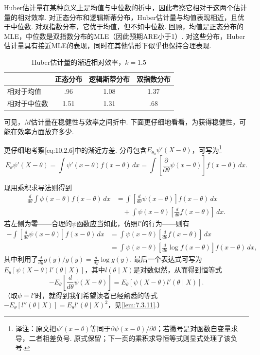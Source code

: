 \begin{example}[Huber估计量的ARE]\label{ex:10.2.7}
Huber估计量在某种意义上是均值与中位数的折中，因此考察它相对于这两个估计量的相对效率. 对正态分布和逻辑斯蒂分布，Huber估计量与均值表现相近，且优于中位数. 对双指数分布，它优于均值，但不如中位数. 回顾，均值是正态分布的MLE，中位数是双指数分布的MLE（因此预期ARE小于1）. 对这些分布，Huber估计量具有接近MLE的表现，同时在其他情形下似乎也保持合理表现.

\par\begin{table}[htbp]\centering
\caption{Huber估计量的渐近相对效率，$k=1.5$}\label{tab:10.2.4}
\begin{tabular}{l|ccc}\toprule
&正态分布&逻辑斯蒂分布&双指数分布\\\midrule
相对于均值&.96&1.08&1.37\\
相对于中位数&1.51&1.31&.68\\\bottomrule
\end{tabular}
\end{table}\par
\end{example}

可见，$M$估计量在稳健性与效率之间折中. 下面更仔细地看看，为获得稳健性，可能在效率方面放弃多少.

更仔细地考察\eqref{eq:10.2.6}中的渐近方差. 分母包含$E_{\theta_0}\psi'(X-\theta)$，可写为\footnote{译注：原文把$\psi'(x-\theta)$等同于$\partial\psi(x-\theta)/\partial\theta$；若撇号是对函数自变量求导，二者相差负号. 原式保留；下一页的乘积求导恒等式则显式处理了该负号.}
$$E_\theta\psi'(X-\theta)=\int\psi'(x-\theta)f(x-\theta)\,dx
=\int\left[\frac\partial{\partial\theta}\psi(x-\theta)\right]f(x-\theta)\,dx.$$

现用乘积求导法则得到
$$\begin{aligned}
\frac d{d\theta}\int\psi(x-\theta)f(x-\theta)\,dx
&=\int\left[\frac d{d\theta}\psi(x-\theta)\right]f(x-\theta)\,dx\\
&\quad+\int\psi(x-\theta)\left[\frac d{d\theta}f(x-\theta)\right]\,dx.
\end{aligned}$$
若左侧为零——合理的$\psi$函数应当如此，仿照$l'$的行为——则有
$$\begin{aligned}
-\int\left[\frac d{d\theta}\psi(x-\theta)\right]f(x-\theta)\,dx
&=\int\psi(x-\theta)\left[\frac d{d\theta}f(x-\theta)\right]\,dx\\
&=\int\psi(x-\theta)\left[\frac d{d\theta}\log f(x-\theta)\right]f(x-\theta)\,dx,
\end{aligned}$$
其中利用了$\frac d{dy}g(y)/g(y)=\frac d{dy}\log g(y)$. 最后一个表达式可写为$E_\theta[\psi(X-\theta)l'(\theta\mid X)]$，其中$l(\theta\mid X)$是对数似然，从而得到恒等式
$$-E_\theta\left[\frac d{d\theta}\psi(X-\theta)\right]=E_\theta[\psi(X-\theta)l'(\theta\mid X)].$$
（取$\psi=l'$时，就得到我们希望读者已经熟悉的等式$-E_\theta[l''(\theta\mid X)]=E_\theta l'(\theta\mid X)^2$，见\autoref{lem:7.3.11}.）

